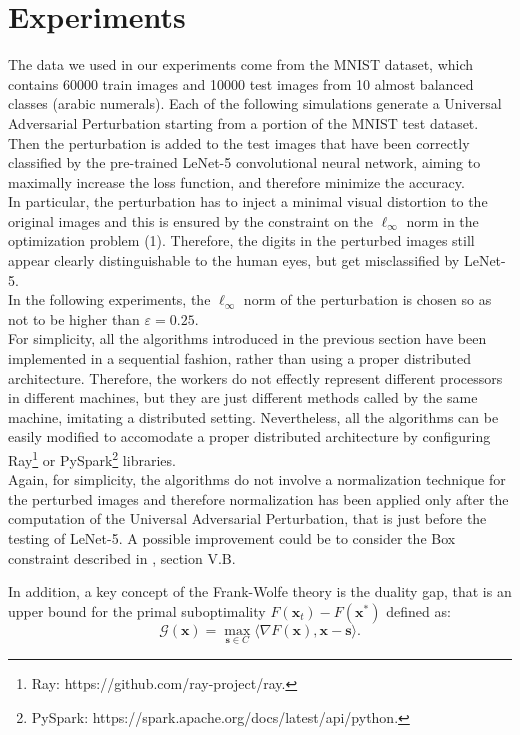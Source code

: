 \section{Experiments}
The data we used in our experiments come from the MNIST dataset, which contains 60000 train images and 10000 test images
from 10 almost balanced classes (arabic numerals). Each of the following simulations generate a Universal Adversarial Perturbation
starting from a portion of the MNIST test dataset. Then the perturbation is added to the test images that have been correctly classified by the pre-trained LeNet-5 convolutional neural network, aiming to maximally increase the loss function, and therefore minimize the accuracy.\\
\indent In particular, the perturbation has to inject a minimal visual distortion to the original images and this is ensured by the constraint on the $\ell_{\infty}$ norm in the optimization problem (1). Therefore, the digits in the perturbed images still appear clearly distinguishable to the human eyes, but get misclassified by LeNet-5.\\
\indent 
In the following experiments, the $\ell_{\infty}$ norm of the perturbation is chosen so as not to be higher than $\varepsilon=0.25$.\\

For simplicity, all the algorithms introduced in the previous section have been implemented in a sequential fashion, rather than using a proper distributed architecture. Therefore, the workers do not effectly represent different processors in different machines, but they are just different methods called by the same machine, imitating a distributed setting. Nevertheless, all the algorithms can be easily modified to accomodate a proper distributed architecture by configuring Ray\footnote{Ray: https://github.com/ray-project/ray.} or PySpark\footnote{PySpark: https://spark.apache.org/docs/latest/api/python.} libraries.\\

Again, for simplicity, the algorithms do not involve a normalization technique for the perturbed images and therefore normalization has been applied only after the computation of the Universal Adversarial Perturbation, that is just before the testing of LeNet-5. A possible improvement could be to consider the Box constraint described in \cite{A1}, section V.B.\indent

In addition, a key concept of the Frank-Wolfe theory is the duality gap, that is an upper bound for the primal suboptimality $F(\mathbf{x}_t)-F(\mathbf{x}^*)$ defined as:
\begin{equation}
	\mathcal{G}(\mathbf{x}) =\max_{\mathbf{s}\in\mathit{C}} \langle \nabla F(\mathbf{x}),\mathbf{x}-\mathbf{s}\rangle.
\end{equation}


